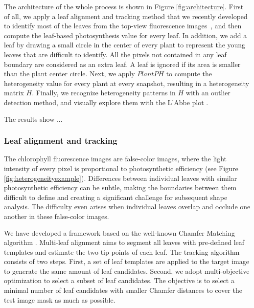 \documentclass{bioinfo}
\begin{document}
{The architecture of the whole process is shown in Figure \ref{fig:architecture}. First of all, we apply a leaf alignment and tracking method that we recently developed to identify most of the leaves from the top-view fluorescence images~\citep{xi2014tracking,yin2014}, and then compute the leaf-based photosynthesis value for every leaf. In addition, we add a leaf by drawing a small circle in the center of every plant to represent the young leaves that are difficult to identify.
%
All the pixels not contained in any leaf boundary are considered as an extra leaf. A leaf is ignored if its area is smaller than the plant center circle.
%
Next, we apply $PlantPH$ to compute the heterogeneity value for every plant at every snapshot, resulting in a heterogeneity matrix $H$. Finally, we recognize heterogeneity patterns in $H$ with an outlier detection method, and visually explore them with the L'Abbe plot \citep{song1999exploring}.

The results show ...

\subsubsection{Leaf alignment and tracking}


The chlorophyll fluorescence images are false-color images, where the light intensity of every pixel is proportional to photosynthetic efficiency \citep{toet1996new} (see Figure \ref{fig:heterogeneityexample}). Differences between individual leaves with similar photosynthetic efficiency can be subtle, making the boundaries between them difficult to define and creating a significant challenge for subsequent shape analysis. The difficulty even arises when individual leaves overlap and occlude one another in these false-color images.

We have developed a framework based on the well-known Chamfer Matching algorithm \citep{yin2014}. Multi-leaf alignment aims to segment all leaves with pre-defined leaf templates and estimate the two tip points of each leaf. The tracking algorithm consists of two steps. First, a set of leaf templates are applied to the target image to generate the same amount of leaf candidates. Second, we adopt multi-objective optimization to select a subset of leaf candidates. The objective is to select a minimal number of leaf candidates with smaller Chamfer distances to cover the test image mask as much as possible.

}
\end{document}
